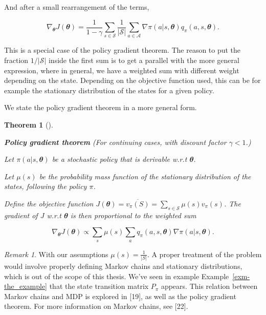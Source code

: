\documentclass[
  letterpaper,
]{report}
\theoremstyle{plain}
\newtheorem{theorem}{Theorem}[chapter]
\theoremstyle{definition}
\theoremstyle{definition}
\theoremstyle{remark}
\newtheorem*{remark}{Remark}
\begin{document}
And after a small rearrangement of the terms,

\[
\nabla_{\mathbfit{\theta}} J(\mathbfit{\theta}) = \frac{1}{1-\gamma}\sum_{s\in \mathcal{S}}\frac{1}{|\mathcal{S}|}\sum_{a\in\mathcal{A}}\nabla\pi(a|s,{\mathbfit{\theta}})q_\pi(a,s,{\mathbfit{\theta}}).
\]

This is a special case of the policy gradient theorem. The reason to put
the fraction \(1/|\mathcal{S}|\) inside the first sum is to get a
parallel with the more general expression, where in general, we have a
weighted sum with different weight depending on the state. Depending on
the objective function used, this can be for example the stationary
distribution of the states for a given policy.

We state the policy gradient theorem in a more general form.

\leavevmode{}%
\begin{theorem}[]\label{thm-policyGradient}

\textbf{Policy gradient theorem} (For continuing cases, with discount
factor \(\gamma < 1\).)

Let \(\pi(a|s,\mathbfit{\theta})\) be a stochastic policy that is
derivable w.r.t \(\mathbfit{\theta}\).

Let \(\mu(s)\) be the probability mass function of the stationary
distribution of the states, following the policy \(\pi\).

Define the objective function
\(J(\mathbfit{\theta}) = \overline{v_\pi(S)} = \sum_{s\in \mathcal{S}}\mu(s)v_\pi(s)\).
The gradient of \(J\) w.r.t \(\mathbfit{\theta}\) is then proportional
to the weighted sum

\[
\nabla_{\mathbfit{\theta}} J({\mathbfit{\theta}}) \propto \sum_s \mu(s) \sum_a q_\pi(a,s, {\mathbfit{\theta}})\nabla \pi(a|s, {\mathbfit{\theta}}).
\]

\end{theorem}

\begin{remark}

With our assumptions \(\mu(s) = \frac{1}{|S|}\). A proper treatment of
the problem would involve properly defining Markov chains and stationary
distributions, which is out of the scope of this thesis. We've seen in
example Example~\ref{exm-the_example} that the state transition matrix
\(P_\pi\) appears. This relation between Markov chains and MDP is
explored in {[}19{]}, as well as the policy gradient theorem. For more
information on Markov chains, see {[}22{]}.

\end{remark}
\end{document}
